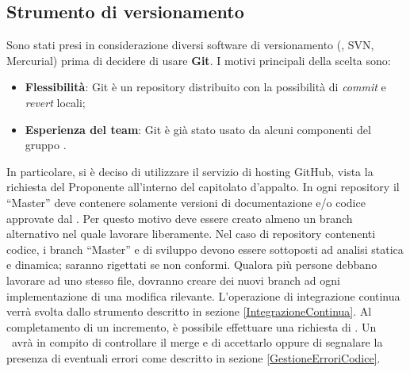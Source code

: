 \documentclass[../NormeDiProgetto.tex]{subfiles}
\begin{document}
		\subsection{Strumento di versionamento}\label{StrumentoDiVersionamento}
			Sono stati presi in considerazione diversi software di versionamento (, SVN, Mercurial)
			prima di decidere di usare \textbf{Git}. I motivi principali della scelta sono: 
			\begin{itemize}
				\item \textbf{Flessibilità}: Git è un repository distribuito con la possibilità di
				\textit{commit} e \textit{revert} locali;
				\item \textbf{Esperienza del team}: Git è già stato usato da alcuni componenti
				del gruppo \kaleidoscode.
			\end{itemize}
			In particolare, si è deciso di utilizzare il servizio di hosting GitHub, vista la richiesta
			del Proponente all'interno del capitolato d'appalto.
			In ogni repository il  ``Master'' deve contenere solamente versioni di documentazione e/o
			codice approvate dal \responsabilediprogetto. Per questo motivo deve essere creato almeno un
			branch alternativo nel quale lavorare liberamente.
			Nel caso di repository contenenti codice, i branch ``Master'' e di sviluppo devono essere
			sottoposti ad analisi statica e dinamica; saranno rigettati se non conformi.
			Qualora più persone debbano lavorare ad uno stesso file, dovranno creare dei nuovi branch ad ogni
			implementazione di una modifica rilevante.
			L'operazione di integrazione continua verrà svolta dallo strumento descritto in sezione
			\ref{IntegrazioneContinua}.
			Al completamento di un incremento, è possibile effettuare una richiesta di .
			Un \verificatore\ avrà in compito di controllare il merge e di accettarlo oppure di segnalare
			la presenza di eventuali errori come descritto in sezione \ref{GestioneErroriCodice}.
\end{document}
